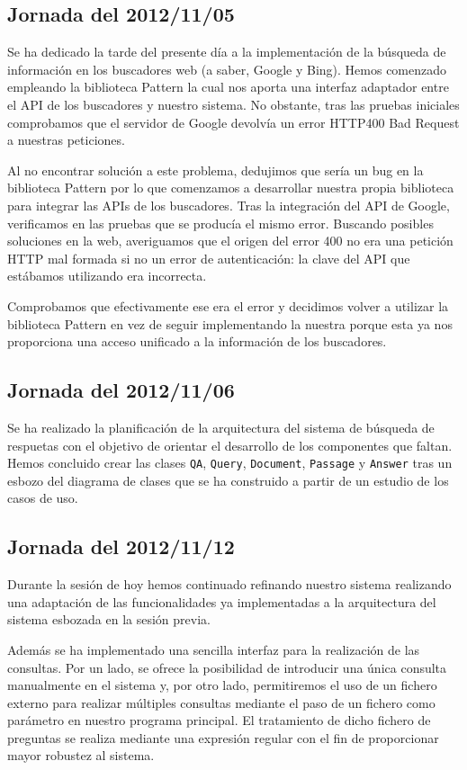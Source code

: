 \documentclass[12pt,a4paper,titlepage]{article}
\begin{document}
\subsection{Jornada del 2012/11/05}
Se ha dedicado la tarde del presente día a la implementación de la búsqueda de información en los buscadores web (a saber, Google y Bing). Hemos comenzado empleando la biblioteca Pattern\cite{pattern} la cual nos aporta una interfaz adaptador entre el API de los buscadores y nuestro sistema. No obstante, tras las pruebas iniciales comprobamos que el servidor de Google devolvía un error HTTP400 Bad Request a nuestras peticiones.

Al no encontrar solución a este problema, dedujimos que sería un bug en la biblioteca Pattern por lo que comenzamos a desarrollar nuestra propia biblioteca para integrar las APIs de los buscadores. Tras la integración del API de Google, verificamos en las pruebas que se producía el mismo error. Buscando posibles soluciones en la web, averiguamos que el origen del error 400 no era una petición HTTP mal formada si no un error de autenticación: la clave del API que estábamos utilizando era incorrecta.

Comprobamos que efectivamente ese era el error y decidimos volver a utilizar la biblioteca Pattern en vez de seguir implementando la nuestra porque esta ya nos proporciona una acceso unificado a la información de los buscadores.

\subsection{Jornada del 2012/11/06}
Se ha realizado la planificación de la arquitectura del sistema de búsqueda de respuetas con el objetivo de orientar el desarrollo de los componentes que faltan. Hemos concluido crear las clases \texttt{QA}, \texttt{Query}, \texttt{Document}, \texttt{Passage} y \texttt{Answer} tras un esbozo del diagrama de clases que se ha construido a partir de un estudio de los casos de uso.

\subsection{Jornada del 2012/11/12}
Durante la sesión de hoy hemos continuado refinando nuestro sistema realizando una adaptación de las funcionalidades ya implementadas a la arquitectura del sistema esbozada en la sesión previa.

Además se ha implementado una sencilla interfaz para la realización de las consultas. Por un lado, se ofrece la posibilidad de introducir una única consulta manualmente en el sistema y, por otro lado, permitiremos el uso de un fichero externo para realizar múltiples consultas mediante el paso de un fichero como parámetro en nuestro programa principal. El tratamiento de dicho fichero de preguntas se realiza mediante una expresión regular con el fin de proporcionar mayor robustez al sistema.
\end{document}
